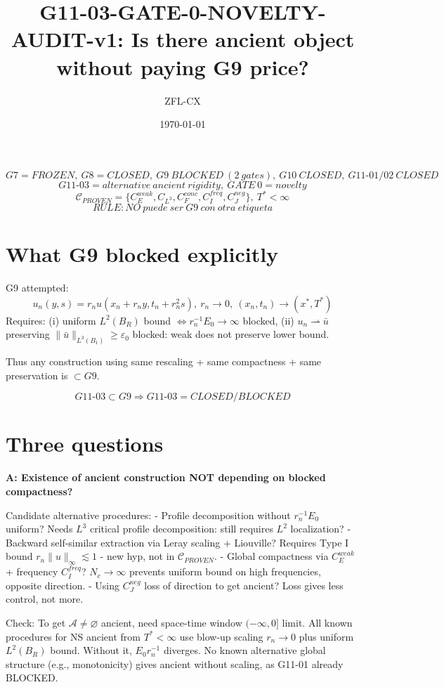 \documentclass[11pt]{article}
\begin{document}
\title{G11-03-GATE-0-NOVELTY-AUDIT-v1: Is there ancient object without paying G9 price?}
\author{ZFL-CX}\date{\today}\maketitle

\[
\boxed{G7=FROZEN,\ G8=CLOSED,\ G9\ BLOCKED\ (2\ gates),\ G10\ CLOSED,\ G11\text{-}01/02\ CLOSED}
\]
\[
\boxed{G11\text{-}03 = alternative\ ancient\ rigidity,\ GATE\ 0 = novelty}
\]
\[
\boxed{\mathcal C_{PROVEN}=\{C_E^{weak},C_{L^3},C_F^{conc},C_I^{freq},C_J^{neg}\},\ T^*<\infty}
\]
\[
\boxed{RULE: NO\ puede\ ser\ G9\ con\ otra\ etiqueta}
\]

\section{What G9 blocked explicitly}
G9 attempted:
\[
u_n(y,s)=r_n u(x_n+r_n y,t_n+r_n^2 s),\ r_n\to0,\ (x_n,t_n)\to(x^*,T^*)
\]
Requires: (i) uniform $L^2(B_R)$ bound $\iff r_n^{-1}E_0\to\infty$ blocked, (ii) $u_n\rightharpoonup\bar u$ preserving $\|\bar u\|_{L^3(B_1)}\ge\varepsilon_0$ blocked: weak does not preserve lower bound.

Thus any construction using same rescaling + same compactness + same preservation is $\subset G9$.

\[
\boxed{G11\text{-}03\subset G9\Rightarrow G11\text{-}03=CLOSED/BLOCKED}
\]

\section{Three questions}

\textbf{A: Existence of ancient construction NOT depending on blocked compactness?}

Candidate alternative procedures:
- Profile decomposition without $r_n^{-1}E_0$ uniform? Needs $L^3$ critical profile decomposition: still requires $L^2$ localization?
- Backward self-similar extraction via Leray scaling + Liouville? Requires Type I bound $r_n\|u\|_\infty\lesssim1$ - new hyp, not in $\mathcal C_{PROVEN}$.
- Global compactness via $C_E^{weak}$ + frequency $C_I^{freq}$? $N_c\to\infty$ prevents uniform bound on high frequencies, opposite direction.
- Using $C_J^{neg}$ loss of direction to get ancient? Loss gives less control, not more.

Check: To get $\mathcal A\neq\varnothing$ ancient, need space-time window $(-\infty,0]$ limit. All known procedures for NS ancient from $T^*<\infty$ use blow-up scaling $r_n\to0$ plus uniform $L^2(B_R)$ bound. Without it, $E_0 r_n^{-1}$ diverges. No known alternative global structure (e.g., monotonicity) gives ancient without scaling, as G11-01 already BLOCKED.
\end{document}
